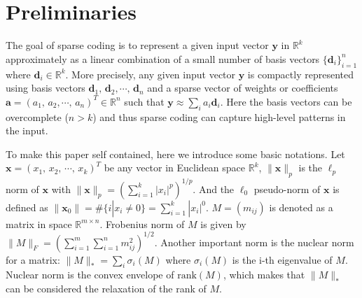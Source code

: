 \section{Preliminaries}
The goal of sparse coding is to represent a given input vector $\mathbf{y}$ in $\mathbb{R}^k$ approximately as a linear combination of a small number of basis vectors $\{\mathbf{d}_i\}_{i=1}^n$ where $\mathbf{d}_i \in\mathbb{R}^k$.
More precisely, any given input vector $\mathbf{y}$ is compactly represented using basis vectors $\mathbf{d}_1,\,\mathbf{d}_2,\cdots,\,\mathbf{d}_n$ and a sparse vector of weights or coefficients $\mathbf{a}=(a_1,\,a_2,\cdots ,\,a_n)^T\in \mathbb{R}^n$ such that $\mathbf{y} \approx \sum_i a_i\mathbf{d}_i$.
Here the basis vectors can be overcomplete ($n>k$) and thus sparse coding can capture high-level patterns in the input.

To make this paper self contained, here we introduce some basic notations.
Let $\mathbf{x}=(x_1,\,x_2,\,\cdots ,\,x_k)^T$ be any vector in Euclidean space $\mathbb{R}^k$, $\|\mathbf{x}\|_p$  is the $\ell_p$ norm of $\mathbf{x}$ with $\|\mathbf{x}\|_p=(\sum_{i=1}^k |x_i|^p)^{1/p}$. And the $\ell_0$ pseudo-norm of $\mathbf{x}$ is defined as $\|\mathbf{x}_0\|=\#\{i|x_i\neq 0\}=\sum_{i=1}^k |x_i|^0$.
$M=(m_{ij})$ is denoted as a matrix in space $\mathbb{R}^{m\times n}$.
Frobenius norm of $M$ is given by $\|M\|_F=(\sum_{i=1}^m\sum_{i=1}^n m_{ij}^2)^{1/2}$.
Another important norm is the nuclear norm for a matrix: $\|M\|_* = \sum_i \sigma_i(M)$ where $\sigma_i(M)$ is the i-th eigenvalue of $M$.
Nuclear norm is the convex envelope of $\mathrm{rank}(M)$, which makes that $\|M\|_*$ can be considered the relaxation of the rank of $M$.
